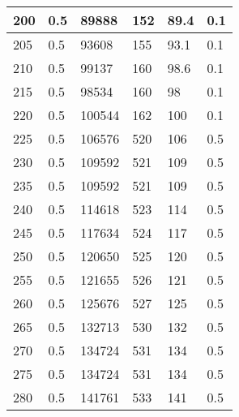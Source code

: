 \begin{center}
\begin{longtable}{|l|l|l|l|l|l|}
200    & 0.5     & 89888            & 152          & 89.4           & 0.1        \\ \hline
205    & 0.5     & 93608            & 155          & 93.1           & 0.1        \\ \hline
210    & 0.5     & 99137            & 160          & 98.6           & 0.1        \\ \hline
215    & 0.5     & 98534            & 160          & 98             & 0.1        \\ \hline
220    & 0.5     & 100544           & 162          & 100            & 0.1        \\ \hline
225    & 0.5     & 106576           & 520          & 106            & 0.5        \\ \hline
230    & 0.5     & 109592           & 521          & 109            & 0.5        \\ \hline
235    & 0.5     & 109592           & 521          & 109            & 0.5        \\ \hline
240    & 0.5     & 114618           & 523          & 114            & 0.5        \\ \hline
245    & 0.5     & 117634           & 524          & 117            & 0.5        \\ \hline
250    & 0.5     & 120650           & 525          & 120            & 0.5        \\ \hline
255    & 0.5     & 121655           & 526          & 121            & 0.5        \\ \hline
260    & 0.5     & 125676           & 527          & 125            & 0.5        \\ \hline
265    & 0.5     & 132713           & 530          & 132            & 0.5        \\ \hline
270    & 0.5     & 134724           & 531          & 134            & 0.5        \\ \hline
275    & 0.5     & 134724           & 531          & 134            & 0.5        \\ \hline
280    & 0.5     & 141761           & 533          & 141            & 0.5        \\ \hline

\end{longtable}
\end{center}


